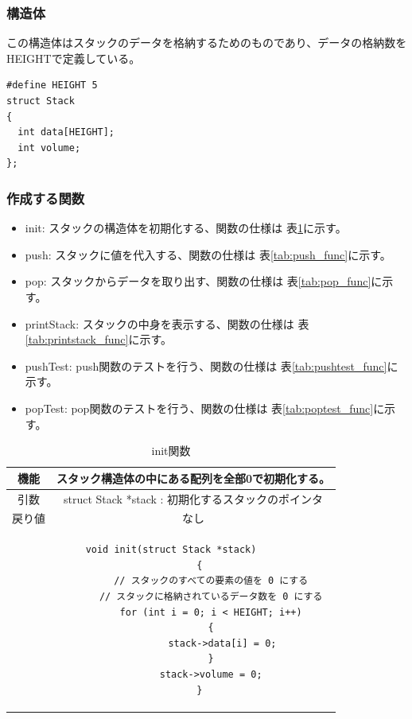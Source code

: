 \documentclass[dvipdfmx]{jsarticle}
\begin{document}
\subsubsection{構造体}
この構造体はスタックのデータを格納するためのものであり、データの格納数をHEIGHTで定義している。
\begin{lstlisting}[caption={stack.h}, label={lst:stackh}]
#define HEIGHT 5
struct Stack
{
  int data[HEIGHT];
  int volume;
};
\end{lstlisting}
\subsubsection{作成する関数}
\begin{itemize}
  \item init: スタックの構造体を初期化する、関数の仕様は 表\ref{tab:init_func}に示す。
  \item push: スタックに値を代入する、関数の仕様は 表\ref{tab:push_func}に示す。
  \item pop: スタックからデータを取り出す、関数の仕様は 表\ref{tab:pop_func}に示す。
  \item printStack: スタックの中身を表示する、関数の仕様は 表\ref{tab:printstack_func}に示す。
  \item pushTest: push関数のテストを行う、関数の仕様は 表\ref{tab:pushtest_func}に示す。
  \item popTest: pop関数のテストを行う、関数の仕様は 表\ref{tab:poptest_func}に示す。
\end{itemize}

\begin{table}[ht]
  \centering
  \begin{tabular}{|c|c|}
    \hline
    機能  & スタック構造体の中にある配列を全部0で初期化する。                  \\
    \hline
    引数  & struct Stack *stack : 初期化するスタックのポインタ       \\
    \hline
    戻り値 & なし                                         \\
    \hline
    \multicolumn{2}{|c|}{
      \begin{minipage}{\linewidth}
        \begin{lstlisting}[frame=single,boxpos=t]
          void init(struct Stack *stack)
          {
              // スタックのすべての要素の値を 0 にする
              // スタックに格納されているデータ数を 0 にする
              for (int i = 0; i < HEIGHT; i++)
              {
                  stack->data[i] = 0;
              }
              stack->volume = 0;
          }
        \end{lstlisting}
      \end{minipage}
    }\\
  \end{tabular}
  \caption{init関数}
  \label{tab:init_func}
\end{table}
\end{document}

